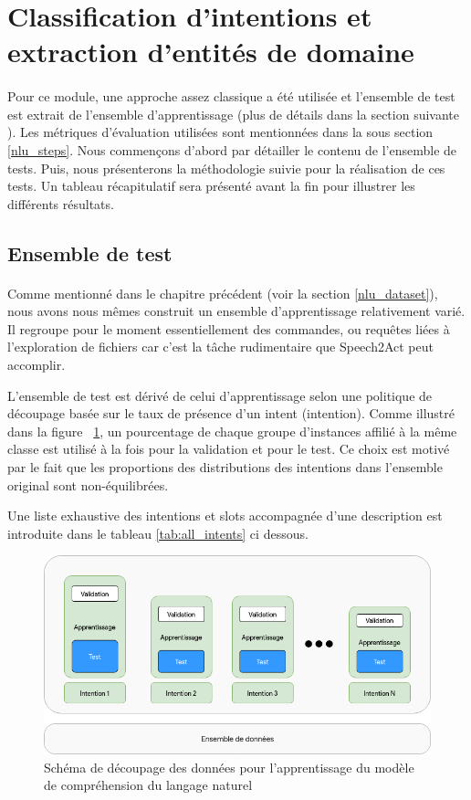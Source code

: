 \section{Classification d'intentions et extraction d'entités de domaine}
\paragraph{}
Pour ce module, une approche assez classique a été utilisée et l'ensemble de test est extrait de l'ensemble d'apprentissage (plus de détails dans la section suivante ). Les métriques d'évaluation utilisées sont mentionnées dans la sous section \ref{nlu_steps}. Nous commençons d'abord par détailler le contenu de l'ensemble de tests. Puis, nous présenterons la méthodologie suivie pour la réalisation de ces tests. Un tableau récapitulatif sera présenté avant la fin pour illustrer les différents résultats.
	\subsection{Ensemble de test}
	\paragraph{}
	Comme mentionné dans le chapitre précédent (voir la section \ref{nlu_dataset}), nous avons nous mêmes construit un ensemble d'apprentissage relativement varié. Il regroupe pour le moment essentiellement des commandes, ou requêtes liées à l'exploration de fichiers car c'est la tâche rudimentaire que Speech2Act peut accomplir.
	\par
	L'ensemble de test est dérivé de celui d'apprentissage selon une politique de découpage basée sur le taux de présence d'un intent (intention). Comme illustré dans la figure ~\ref{fig:split}, un pourcentage de chaque groupe d'instances affilié à la même classe est utilisé à la fois pour la validation et pour le test. Ce choix est motivé par le fait que les proportions des distributions des intentions dans l'ensemble original sont non-équilibrées.
	
	Une liste exhaustive des intentions et slots accompagnée d'une description est introduite dans le tableau \ref{tab:all_intents} ci dessous.
	\begin{figure}[H]
		\centering
		\includegraphics[width=.75\linewidth]{images/implementation/split.png} 
		\caption{Schéma de découpage des données pour l'apprentissage du modèle de compréhension du langage naturel} 
		\label{fig:split}
	\end{figure}

